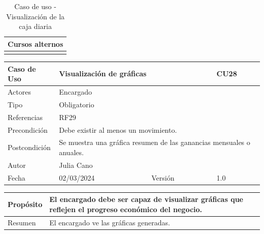 \begin{table}[H]
	\centering
	\begin{tabular}{| m{} | m{} | m{} | m{} |}
		\hline
		\multicolumn{4}{|m{0.9\textwidth}|}{Cursos alternos}     \\ 
		\hline
		 & \multicolumn{3}{m{0.67\textwidth}|}{} \\ 
		\hline
	\end{tabular}
	\caption{Caso de uso - Visualización de la caja diaria}
\end{table}

\newpage


\begin{table}[H]
	\centering
	\begin{tabular}{| m{} | m{} | m{} | m{}|}
		\hline
		\rowcolor{grayshade} Caso de Uso & \multicolumn{2}{|m{0.43\textwidth}|}{Visualización de gráficas} &  CU28\\ 
		\hline
		Actores & \multicolumn{3}{l|}{Encargado} \\ 
		\hline
		Tipo & \multicolumn{3}{l|}{Obligatorio} \\ 
		\hline
		Referencias & \multicolumn{3}{l|}{RF29} \\ 
		\hline
		Precondición & \multicolumn{3}{m{0.67\textwidth}|}{Debe existir al menos un movimiento.} \\ 
		\hline
		Postcondición & \multicolumn{3}{m{0.67\textwidth}|}{Se muestra una gráfica resumen de las ganancias mensuales o anuales.} \\ 
		\hline
		Autor & \multicolumn{3}{l|}{Julia Cano} \\ 
		\hline
		Fecha & 02/03/2024 & Versión & 1.0 \\
		\hline
	\end{tabular}
\end{table}

\begin{table}[H]
	\centering
	\begin{tabular}{| m{} | m{} | m{} | m{} |}
		\hline
		Propósito & \multicolumn{3}{m{0.67\textwidth}|}{El encargado debe ser capaz de visualizar gráficas que reflejen el progreso económico del negocio.}  \\ 
		\hline
		Resumen & \multicolumn{3}{m{0.67\textwidth}|}{El encargado ve las gráficas generadas.} \\ 
		\hline
	\end{tabular}
\end{table}



